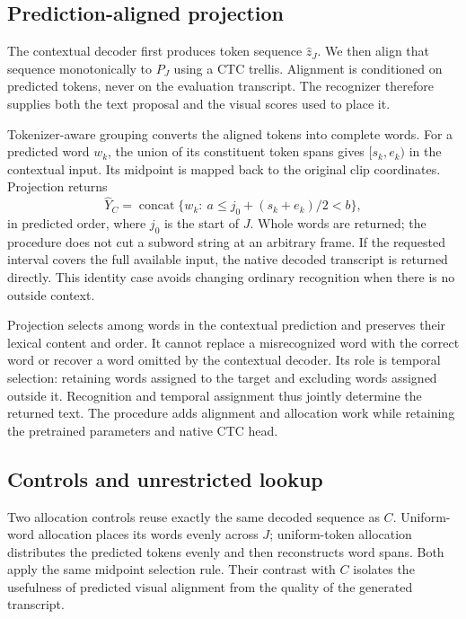 \subsection{Prediction-aligned projection}
The contextual decoder first produces token sequence \(\widehat{z}_J\).
We then align that sequence monotonically to \(P_J\) using a CTC trellis.
Alignment is conditioned on predicted tokens, never on the evaluation
transcript. The recognizer therefore supplies both the text proposal and the
visual scores used to place it.

Tokenizer-aware grouping converts the aligned tokens into complete words.
For a predicted word \(w_k\), the union of its constituent token spans gives
\([s_k,e_k)\) in the contextual input. Its midpoint is mapped back to the
original clip coordinates. Projection returns
\begin{equation}
 \widehat{Y}_C
 = \operatorname{concat}\{w_k:\ a \leq j_0+(s_k+e_k)/2 < b\},
 \label{eq:projection}
\end{equation}
in predicted order, where \(j_0\) is the start of \(J\). Whole words are returned;
the procedure does not cut a subword string at an arbitrary frame.
If the requested interval covers the full available input, the native decoded
transcript is returned directly. This identity case avoids changing ordinary
recognition when there is no outside context.

Projection selects among words in the contextual prediction and preserves
their lexical content and order. It cannot replace a misrecognized word with
the correct word or recover a word omitted by the contextual decoder.
Its role is temporal selection: retaining words assigned to the target and
excluding words assigned outside it. Recognition and temporal assignment thus
jointly determine the returned text. The procedure adds alignment and
allocation work while retaining the pretrained parameters and native CTC head.

\subsection{Controls and unrestricted lookup}
Two allocation controls reuse exactly the same decoded sequence as \(C\).
Uniform-word allocation places its words evenly across \(J\); uniform-token
allocation distributes the predicted tokens evenly and then reconstructs word
spans. Both apply the same midpoint selection rule. Their contrast with \(C\)
isolates the usefulness of predicted visual alignment from the quality of the
generated transcript.

